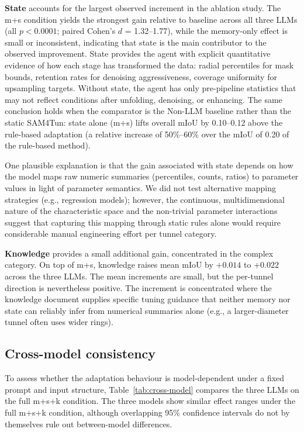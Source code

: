 \documentclass[a4paper,fleqn]{cas-dc}
\begin{document}
{\textbf{State} accounts for the largest observed increment in the ablation study. The m+s condition yields the strongest gain relative to baseline across all three LLMs (all $p < 0.0001$; paired Cohen's \mbox{$d$} = 1.32--1.77), while the memory-only effect is small or inconsistent, indicating that state is the main contributor to the observed improvement. State provides the agent with explicit quantitative evidence of how each stage has transformed the data: radial percentiles for mask bounds, retention rates for denoising aggressiveness, coverage uniformity for upsampling targets. Without state, the agent has only pre-pipeline statistics that may not reflect conditions after unfolding, denoising, or enhancing. The same conclusion holds when the comparator is the Non-LLM baseline rather than the static SAM4Tun: state alone (m+s) lifts overall mIoU by 0.10--0.12 above the rule-based adaptation (a relative increase of 50\%--60\% over the mIoU of 0.20 of the rule-based method).


One plausible explanation is that the gain associated with state depends on how the model maps raw numeric summaries (percentiles, counts, ratios) to parameter values in light of parameter semantics. We did not test alternative mapping strategies (e.g., regression models); however, the continuous, multidimensional nature of the characteristic space and the non-trivial parameter interactions suggest that capturing this mapping through static rules alone would require considerable manual engineering effort per tunnel category.

\textbf{Knowledge} provides a small additional gain, concentrated in the complex category. On top of m+s, knowledge raises mean mIoU by $+0.014$ to $+0.022$ across the three LLMs. The mean increments are small, but the per-tunnel direction is nevertheless positive. The increment is concentrated where the knowledge document supplies specific tuning guidance that neither memory nor state can reliably infer from numerical summaries alone (e.g.,  a larger-diameter tunnel often uses wider rings).


\subsection{Cross-model consistency}\label{sec:consistency}

To assess whether the adaptation behaviour is model-dependent under a fixed prompt and input structure, Table~\ref{tab:cross-model} compares the three LLMs on the full m+s+k condition. The three models show similar effect ranges under the full m+s+k condition, although overlapping 95\% confidence intervals do not by themselves rule out between-model differences.

}
\end{document}
